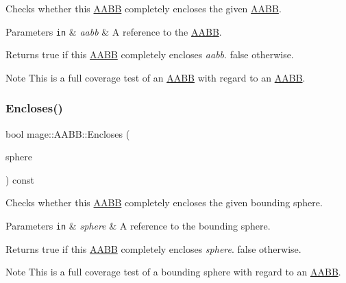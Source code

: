 Checks whether this \mbox{\hyperlink{classmage_1_1_a_a_b_b}{A\+A\+BB}} completely encloses the given \mbox{\hyperlink{classmage_1_1_a_a_b_b}{A\+A\+BB}}.


\begin{DoxyParams}[1]{Parameters}
\mbox{\tt in}  & {\em aabb} & A reference to the \mbox{\hyperlink{classmage_1_1_a_a_b_b}{A\+A\+BB}}. \\
\hline
\end{DoxyParams}
\begin{DoxyReturn}{Returns}
{\ttfamily true} if this \mbox{\hyperlink{classmage_1_1_a_a_b_b}{A\+A\+BB}} completely encloses {\itshape aabb}. {\ttfamily false} otherwise. 
\end{DoxyReturn}
\begin{DoxyNote}{Note}
This is a full coverage test of an \mbox{\hyperlink{classmage_1_1_a_a_b_b}{A\+A\+BB}} with regard to an \mbox{\hyperlink{classmage_1_1_a_a_b_b}{A\+A\+BB}}. 
\end{DoxyNote}
\mbox{\label{classmage_1_1_a_a_b_b_ac8c2cadc06a6ad102c322504a43ca443}} 
\subsubsection{\texorpdfstring{Encloses()}{Encloses()}\hspace{0.1cm}{\footnotesize\ttfamily [4/4]}}
{\footnotesize\ttfamily bool mage\+::\+A\+A\+B\+B\+::\+Encloses (\begin{DoxyParamCaption}\item[{const \mbox{\hyperlink{classmage_1_1_bounding_sphere}{Bounding\+Sphere}} \&}]{sphere }\end{DoxyParamCaption}) const\hspace{0.3cm}{\ttfamily [noexcept]}}

Checks whether this \mbox{\hyperlink{classmage_1_1_a_a_b_b}{A\+A\+BB}} completely encloses the given bounding sphere.


\begin{DoxyParams}[1]{Parameters}
\mbox{\tt in}  & {\em sphere} & A reference to the bounding sphere. \\
\hline
\end{DoxyParams}
\begin{DoxyReturn}{Returns}
{\ttfamily true} if this \mbox{\hyperlink{classmage_1_1_a_a_b_b}{A\+A\+BB}} completely encloses {\itshape sphere}. {\ttfamily false} otherwise. 
\end{DoxyReturn}
\begin{DoxyNote}{Note}
This is a full coverage test of a bounding sphere with regard to an \mbox{\hyperlink{classmage_1_1_a_a_b_b}{A\+A\+BB}}. 
\end{DoxyNote}
\mbox{\label{classmage_1_1_a_a_b_b_a0399860c66da2dfc593b6ad5702c7525}} 
